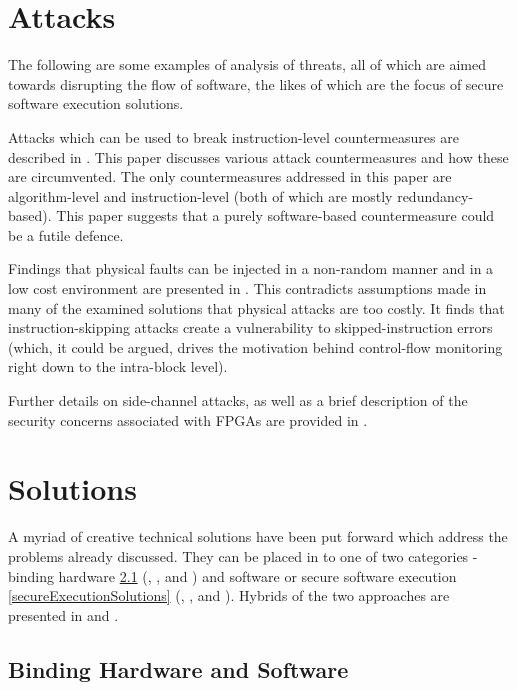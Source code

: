 \section{Attacks}

The following are some examples of analysis of threats, all of which are aimed towards disrupting the flow of software, the likes of which are the focus of secure software execution solutions. 

Attacks which can be used to break instruction-level countermeasures are described in \cite{Yuce2016a}. This paper discusses various attack countermeasures and how these are circumvented. The only countermeasures addressed in this paper are algorithm-level and instruction-level (both of which are mostly redundancy-based). This paper suggests that a purely software-based countermeasure could be a futile defence.

Findings that physical faults can be injected in a non-random manner and in a low cost environment are presented in \cite{Kelly2017}. This contradicts assumptions made in many of the examined solutions that physical attacks are too costly. It finds that instruction-skipping attacks create a vulnerability to skipped-instruction errors (which, it could be argued, drives the motivation behind control-flow monitoring right down to the intra-block level).

Further details on side-channel attacks, as well as a brief description of the security concerns associated with FPGAs are provided in \cite{GebotysCatherineH2010Sied}.

\section{Solutions} \label{solutionsDescriptions}

A myriad of creative technical solutions have been put forward which address the problems already discussed. They can be placed in to one of two categories - binding hardware \ref{bindingSolutions} (\cite{Lee2016}, \cite{Schaller2014}, \cite{Gora2010} and \cite{Simpson2006}) and software or secure software execution \ref{secureExecutionSolutions} (\cite{Werner2016}, \cite{Wang2016}, \cite{Abera2016} and \cite{Arora2006}). Hybrids of the two approaches are presented in \cite{Kleber2015} and \cite{Kohnhauser2015}.

\subsection{Binding Hardware and Software}\label{bindingSolutions}

